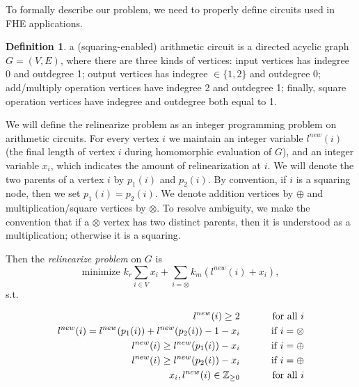 \documentclass[11pt]{article} %
\theoremstyle{plain}
\theoremstyle{definition}
\newtheorem{definition}{Definition}
\begin{document}
To formally describe our problem, we need to properly define circuits used in FHE applications. 

\begin{definition}
a (squaring-enabled) arithmetic circuit is a directed acyclic graph $G = (V,E)$, where there are three kinds of vertices: input vertices has indegree 0 and outdegree 1; output vertices has indegree $\in \{1, 2\}$ and outdegree 0; add/multiply operation vertices have indegree 2 and outdegree 1; finally, square operation vertices have indegree and outdegree both equal to 1. 
\end{definition}

We will define the relinearize problem as an integer programming problem on  arithmetic circuits. For every vertex $i$ we maintain an integer variable $l^{new}(i)$ (the final length of vertex $i$ during homomorphic evaluation of $G$), and an integer 
variable $x_i$, which indicates the amount of relinearization at $i$. We will denote the two parents of a vertex $i$ by $p_1(i)$ and $p_2(i)$. By convention, if $i$ is a squaring node, then we set $p_1(i) = p_2(i)$. We denote addition vertices by $\oplus$ and multiplication/square vertices by $\otimes$. To resolve ambiguity, we make the convention that if a $\otimes$ vertex has two distinct parents, then it is understood as a multiplication; otherwise it is a squaring.

Then the {\it relinearize problem} on $G$ is 
\[
	\mbox{minimize } k_r \sum_{i \in V } x_i  + \sum_{i = \otimes} k_m (l^{new}(i) + x_i), 
\]
s.t. 

\begin{align*}
l^{new}(i) \geq 2  & \qquad &\mbox{ for all } i \\ 
l^{new}(i)  = l^{new}(p_1(i)) + l^{new}(p_2(i)) - 1 - x_i  & \qquad & \mbox{if } i = \otimes \\ 
l^{new}(i)  \geq l^{new}(p_1(i))  - x_i  & \qquad & \mbox{if } i = \oplus \\ 
l^{new}(i)  \geq l^{new}(p_2(i))  - x_i  & \qquad & \mbox{if } i = \oplus \\
x_i, l^{new}(i) \in \mathbb{Z}_{\geq 0}  & \qquad &\mbox{ for all } i \\
\end{align*}
\end{document}
